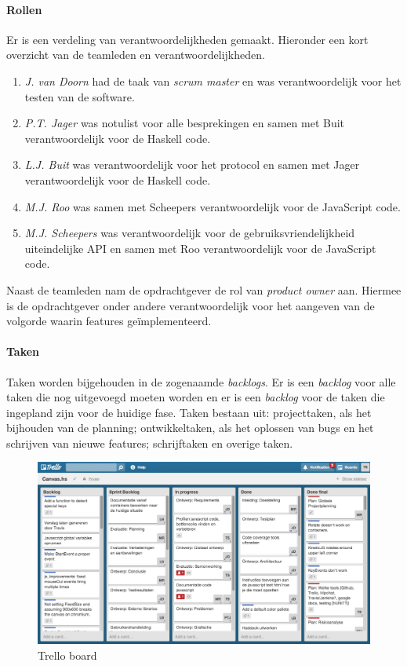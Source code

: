 \paragraph{Rollen} Er is een verdeling van verantwoordelijkheden gemaakt. Hieronder een kort overzicht van de teamleden en verantwoordelijkheden.
\begin{enumerate}
    \item \emph{J. van Doorn} had de taak van \emph{scrum master} en was verantwoordelijk voor het testen van de software.
    \item \emph{P.T. Jager} was notulist voor alle besprekingen en samen met Buit verantwoordelijk voor de Haskell code.
    \item \emph{L.J. Buit} was verantwoordelijk voor het protocol en samen met Jager verantwoordelijk voor de Haskell code.
    \item \emph{M.J. Roo} was samen met Scheepers verantwoordelijk voor de JavaScript code.
    \item \emph{M.J. Scheepers} was verantwoordelijk voor de gebruiksvriendelijkheid uiteindelijke API en samen met Roo verantwoordelijk voor de JavaScript code.
\end{enumerate}
Naast de teamleden nam de opdrachtgever de rol van \emph{product owner} aan. Hiermee is de opdrachtgever onder andere verantwoordelijk voor het aangeven van de volgorde waarin features ge\"implementeerd.

\paragraph{Taken}
Taken worden bijgehouden in de zogenaamde \emph{backlogs}. Er is een \emph{backlog} voor alle taken die nog uitgevoegd moeten worden en er is een \emph{backlog} voor de taken die ingepland zijn voor de huidige fase. Taken bestaan uit: projecttaken, als het bijhouden van de planning; ontwikkeltaken, als het oplossen van bugs en het schrijven van nieuwe features; schrijftaken en overige taken.

\begin{figure}[H]
\begin{center}
\includegraphics[keepaspectratio,width=\textwidth]{./images/trello.png}
\caption{Trello board}
\label{fig:trello}
\end{center}
\end{figure}

